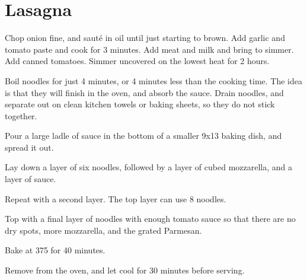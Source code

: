 \section{Lasagna}

\begin{recipe}



Chop onion fine, and sauté in oil until just starting to brown. Add garlic and tomato paste and cook for 3 minutes.
Add meat and milk and bring to simmer. Add canned tomatoes.
Simmer uncovered on the lowest heat for 2 hours.


Boil noodles for just 4 minutes, or 4 minutes less than the cooking time. The idea is that they will finish in the oven,
and absorb the sauce. Drain noodles, and separate out on clean kitchen towels or baking sheets, so they do not stick together.

Pour a large ladle of sauce in the bottom of a smaller 9x13 baking dish, and spread it out.

Lay down a layer of six noodles, followed by a layer of cubed mozzarella, and a layer of sauce.

Repeat with a second layer. The top layer can use 8 noodles. 


Top with a final layer of noodles with enough tomato sauce so that there are no dry spots, more mozzarella, and the grated Parmesan.

Bake at 375\degree{} for 40 minutes.

Remove from the oven, and let cool for 30 minutes before serving.

\end{recipe}
